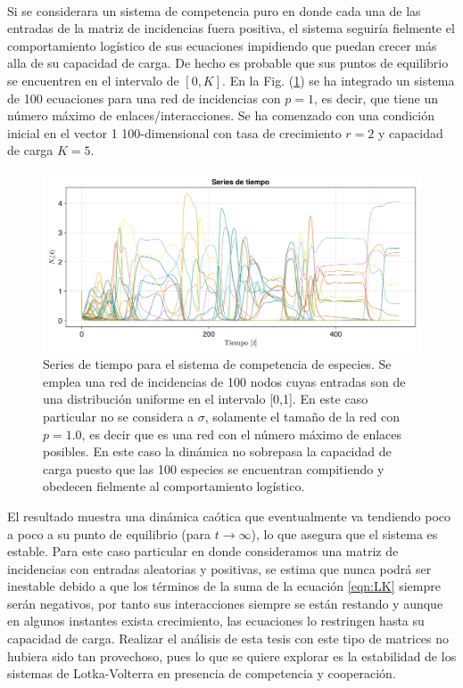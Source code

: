 \\
Si se considerara un sistema de competencia puro en donde cada una de las entradas de la matriz de incidencias fuera positiva, el sistema seguiría fielmente el comportamiento logístico de sus ecuaciones impidiendo que puedan crecer más alla de su capacidad de carga. De hecho es probable que sus puntos de equilibrio se encuentren en el intervalo de $[0,K]$. En la Fig. (\ref{fig:Seriesdetiempopostiva}) se ha integrado un sistema de 100 ecuaciones para una red de incidencias con $p=1$, es decir, que tiene un número máximo de enlaces/interacciones. Se ha comenzado con una condición inicial en el vector 1 100-dimensional con tasa de crecimiento $r=2$ y capacidad de carga $K=5$. 
\begin{figure}[h!]
	\centering
	\includegraphics[scale=0.23]{../Imagenes/Seriesdetiempopositiva}
	\caption{Series de tiempo para el sistema de competencia de especies. Se emplea una red de incidencias de 100 nodos cuyas entradas son de una distribución uniforme en el intervalo [0,1]. En este caso particular no se considera a $\sigma$, solamente el tamaño de la red con $p=1.0$, es decir que es una red con el número máximo de enlaces posibles. En este caso la dinámica no sobrepasa la capacidad de carga puesto que las 100 especies se encuentran compitiendo y obedecen fielmente al comportamiento logístico.}
	\label{fig:Seriesdetiempopostiva}
\end{figure}
El resultado muestra una dinámica caótica que eventualmente va tendiendo poco a poco a su punto de equilibrio (para $t\to\infty$), lo que asegura que el sistema es estable. Para este caso particular en donde consideramos una matriz de incidencias con entradas aleatorias y positivas, se estima que nunca podrá ser inestable debido a que los términos de la suma de la ecuación \ref{eqn:LK} siempre serán negativos, por tanto sus interacciones siempre se están restando y aunque en algunos instantes exista crecimiento, las ecuaciones lo restringen hasta su capacidad de carga. Realizar el análisis de esta tesis con este tipo de matrices no hubiera sido tan provechoso, pues lo que se quiere explorar es la estabilidad de los sistemas de Lotka-Volterra en presencia de competencia y cooperación.\\
